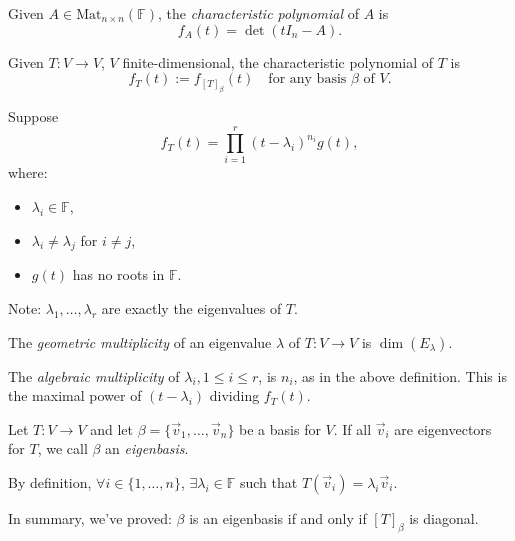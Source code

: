 \documentclass{article}
\begin{document}
\begin{definition}
Given \( A \in \mathrm{Mat}_{n \times n}(\mathbb{F}) \), the \emph{characteristic polynomial} of \( A \) is 
\[
f_A(t) = \det(t I_n - A).
\]

Given \( T: V \to V \), \( V \) finite-dimensional, the characteristic polynomial of \( T \) is 
\[
f_T(t) := f_{[T]_{\beta}}(t) \quad \text{for any basis } \beta \text{ of } V.
\]

\end{definition}


\begin{definition}
Suppose 
\[
f_T(t) = \prod_{i=1}^{r} (t - \lambda_i)^{n_i} g(t),
\]
where:
\begin{itemize}
    \item \(\lambda_i \in \mathbb{F}\),
    \item \(\lambda_i \neq \lambda_j\) for \(i \neq j\),
    \item \(g(t)\) has no roots in \(\mathbb{F}\).
\end{itemize}
Note: \(\lambda_1, \ldots, \lambda_r\) are exactly the eigenvalues of \( T \).
\end{definition}

\begin{definition}[Multiplicities]
The \emph{geometric multiplicity} of an eigenvalue \(\lambda\) of \( T: V \to V \) is \(\dim(E_{\lambda})\).

The \emph{algebraic multiplicity} of \(\lambda_i, 1 \leq i \leq r\), is \(n_i\), as in the above definition. This is the maximal power of \((t - \lambda_i)\) dividing \( f_T(t) \).
\end{definition}


\begin{definition}[Eigenbasis]
Let \( T: V \to V \) and let \( \beta = \{ \vec{v}_1, \ldots, \vec{v}_n \} \) be a basis for \( V \). If all \(\vec{v}_i\) are eigenvectors for \( T \), we call \( \beta \) an \emph{eigenbasis}.

By definition, \(\forall i \in \{1, \ldots, n\}\), \(\exists \lambda_i \in \mathbb{F}\) such that \( T(\vec{v}_i) = \lambda_i \vec{v}_i \).

\end{definition}


\begin{theorem}
In summary, we've proved: \( \beta \) is an eigenbasis if and only if \( [T]_{\beta} \) is diagonal.
\end{theorem}
\end{document}
